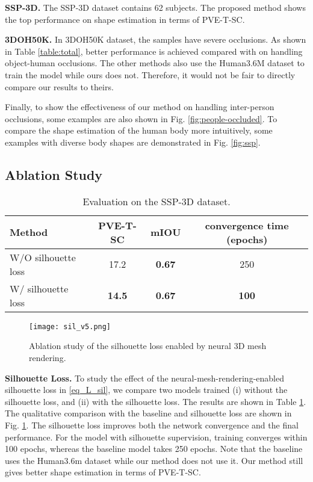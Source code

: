 \documentclass[journal]{IEEEtran}
\begin{document}
\noindent\textbf{SSP-3D.} The SSP-3D dataset contains 62 subjects. The proposed method shows the top performance on shape estimation in terms of PVE-T-SC.

\noindent\textbf{3DOH50K.} In 3DOH50K dataset, the samples have severe occlusions. As shown in Table \ref{table:total}, better performance is achieved compared with \cite{STRAPS2020BMVC} on handling object-human occlusions. The other methods also use the Human3.6M dataset to train the model while ours does not. Therefore, it would not be fair to directly compare our results to theirs.



Finally, to show the effectiveness of our method on handling inter-person occlusions, some examples are also shown in Fig. \ref{fig:people-occluded}. To compare the shape estimation of the human body more intuitively, some examples with diverse body shapes are demonstrated in Fig. \ref{fig:ssp}.

\subsection{Ablation Study}
\begin{table}[htbp]
\caption{ Evaluation on the SSP-3D dataset.}
\begin{center}
\begin{tabular}{@{}lccc@{}}
\toprule
Method          & PVE-T-SC & mIOU & convergence time (epochs) \\ \midrule
W/O silhouette loss   & 17.2  & \textbf{0.67}  & 250 \\
W/ silhouette loss & \textbf{14.5}& \textbf{0.67}  & \textbf{100}\\ \bottomrule
\end{tabular}
\label{silh}
\end{center}
\end{table}

\begin{figure}[htbp]
    \centerline{\texttt{[image: sil\_v5.png]}}
\caption{Ablation study of the silhouette loss enabled by neural 3D mesh rendering.}
    \label{fig:sil}
\end{figure}

\noindent\textbf{Silhouette Loss.} To study the effect of the neural-mesh-rendering-enabled silhouette loss  in {\eqref{eq_L_sil}}, we compare two models trained (i) without the silhouette loss, and (ii) with the silhouette loss. The results are shown in Table \ref{silh}. The qualitative comparison with the baseline and silhouette loss are shown in Fig. \ref{fig:sil}. The silhouette loss improves both the network convergence and the final performance. For the model with silhouette supervision, training converges within 100 epochs, whereas the baseline model takes 250 epochs. Note that the baseline uses the Human3.6m dataset while our method does not use it. Our method still gives better shape estimation in terms of PVE-T-SC.
\end{document}
